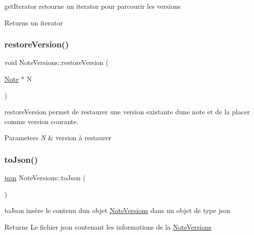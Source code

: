 get\+Iterator retourne un iterator pour parcourir les versions 

\begin{DoxyReturn}{Returns}
un iterator 
\end{DoxyReturn}
\mbox{\label{classNoteVersions_ab96dcb43270c73c6a918c6cc6a4aa924}} 
\subsubsection{\texorpdfstring{restore\+Version()}{restoreVersion()}}
{\footnotesize\ttfamily void Note\+Versions\+::restore\+Version (\begin{DoxyParamCaption}\item[{\hyperlink{classNote}{Note} $\ast$}]{N }\end{DoxyParamCaption})}



restore\+Version permet de restaurer une version existante d\textquotesingle{}une note et de la placer comme version courante. 


\begin{DoxyParams}{Parameters}
{\em N} & version à restaurer \\
\hline
\end{DoxyParams}
\mbox{\label{classNoteVersions_aee4095478320c9899cc0891af31f1151}} 
\subsubsection{\texorpdfstring{to\+Json()}{toJson()}}
{\footnotesize\ttfamily \hyperlink{classnlohmann_1_1basic__json}{json} Note\+Versions\+::to\+Json (\begin{DoxyParamCaption}{ }\end{DoxyParamCaption})}



to\+Json insère le contenu d\textquotesingle{}un objet \hyperlink{classNoteVersions}{Note\+Versions} dans un objet de type json 

\begin{DoxyReturn}{Returns}
Le fichier json contenant les informations de la \hyperlink{classNoteVersions}{Note\+Versions} 
\end{DoxyReturn}
\mbox{\label{classNoteVersions_aae6abd5625c6741a7a1edc251372a469}} 
